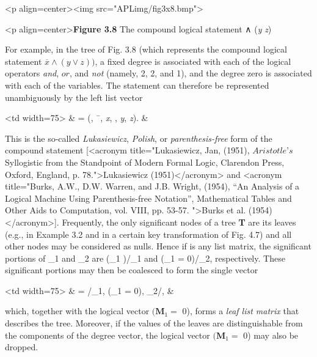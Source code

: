 {<p align=center><img src="APLimg/fig3x8.bmp">

<p align=center>\textbf{Figure 3.8} The compound logical statement 
 ∧ (\textit{y} \vee \textit{z})

\par For example, in the tree of Fig. 3.8 (which represents the compound logical statement $\overline{x} ∧ (y \vee z))$, a fixed degree is associated with each of the logical operators \textit{and}, $or$, and \textit{not} (namely, 2, 2, and 1), and the degree zero is associated with each of the variables. The statement can therefore be represented unambiguously by the left list vector

\begin{tabularx}
<td width=75> & 
 = (\wedge, ¯, \textit{x}, \vee, \textit{y}, \textit{z}). & \\
\end{tabularx}

\par This is the so-called \textit{Lukasiewicz}, \textit{Polish}, or \textit{parenthesis-free} form of the compound statement [<acronym title="Lukasiewicz, Jan, (1951), $Aristotle’s$ Syllogistic from the Standpoint of Modern Formal Logic, Clarendon Press, Oxford, England, p. 78.">Lukasiewicz (1951)</acronym> and 
<acronym title="Burks, A.W., D.W. Warren, and J.B. Wright, (1954), “An Analysis of a Logical Machine Using Parenthesis-free Notation”, Mathematical Tables and Other Aids to Computation, vol. VIII, pp. 53-57. ">Burks et al. (1954)</acronym>]. Frequently, the only significant nodes of a tree \textbf{T} are its leaves (e.g., in Example 3.2 and in a certain key transformation of Fig. 4.7) and all other nodes may be considered as nulls. Hence if  is any list matrix, the significant portions of _{1} and _{2} are (_{1} )/_{1} and (_{1} = 0)/_{2}, respectively. These significant portions may then be coalesced to form the single vector

\begin{tabularx}
<td width=75> & 
 = /_{1}, (_{1} = 0), _{2}/, & \\
\end{tabularx}

\par which, together with the logical vector $(\mathbf{M}_{1} =$ 0), forms a \textit{leaf list matrix} that describes the tree. Moreover, if the values of the leaves are distinguishable from the components of the degree vector, the logical vector $(\mathbf{M}_{1} =$ 0) may also be dropped.

}
